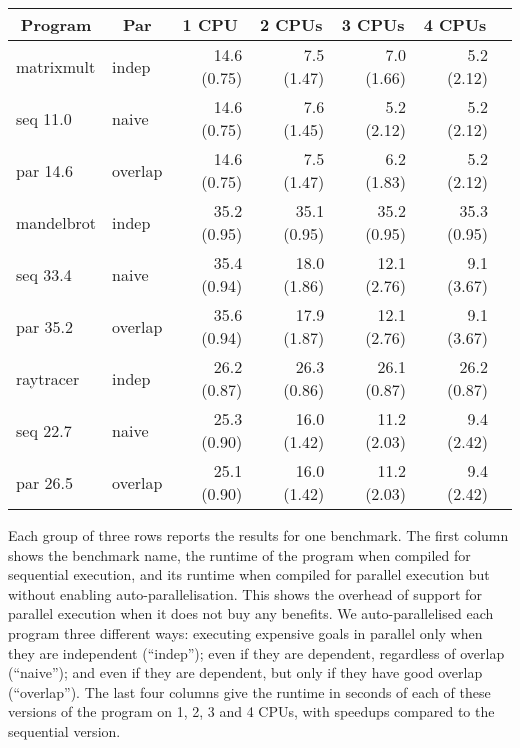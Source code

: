 \begin{table}[tb]
\begin{center}
\begin{tabular}{llrrrrr}
\hline \hline
\multicolumn{1}{c}{\textbf{Program}} &
\multicolumn{1}{c}{\textbf{Par}}    &
\multicolumn{1}{c}{\textbf{1 CPU}}   &
\multicolumn{1}{c}{\textbf{2 CPUs}}  &
\multicolumn{1}{c}{\textbf{3 CPUs}}  &
\multicolumn{1}{c}{\textbf{4 CPUs}}  \\
\hline
matrixmult & indep    & 14.6 (0.75) &  7.5 (1.47) &  7.0 (1.66) &  5.2 (2.12) \\
seq 11.0   & naive    & 14.6 (0.75) &  7.6 (1.45) &  5.2 (2.12) &  5.2 (2.12) \\
par 14.6   & overlap  & 14.6 (0.75) &  7.5 (1.47) &  6.2 (1.83) &  5.2 (2.12) \\
\hline
mandelbrot & indep    & 35.2 (0.95) & 35.1 (0.95) & 35.2 (0.95) & 35.3 (0.95) \\
seq 33.4   & naive    & 35.4 (0.94) & 18.0 (1.86) & 12.1 (2.76) &  9.1 (3.67) \\
par 35.2   & overlap  & 35.6 (0.94) & 17.9 (1.87) & 12.1 (2.76) &  9.1 (3.67) \\
\hline
raytracer  & indep    & 26.2 (0.87) & 26.3 (0.86) & 26.1 (0.87) & 26.2 (0.87) \\
seq 22.7   & naive    & 25.3 (0.90) & 16.0 (1.42) & 11.2 (2.03) &  9.4 (2.42) \\
par 26.5   & overlap  & 25.1 (0.90) & 16.0 (1.42) & 11.2 (2.03) &  9.4 (2.42) \\
\hline \hline
\end{tabular}
\end{center}
\end{table}

Each group of three rows reports the results for one benchmark.
The first column shows the benchmark name,
the runtime of the program when compiled for sequential execution, and
its runtime when compiled for parallel execution
but without enabling auto-parallelisation.
This shows the overhead of support for parallel execution
when it does not buy any benefits.
We auto-parallelised each program three different ways:
executing expensive goals in parallel
only when they are independent (``indep'');
even if they are dependent, regardless of overlap (``naive'');  and
even if they are dependent, but only if they have good overlap (``overlap'').
The last four columns give the runtime in seconds
of each of these versions of the program
on 1, 2, 3 and 4 CPUs,
with speedups compared to the sequential version.

